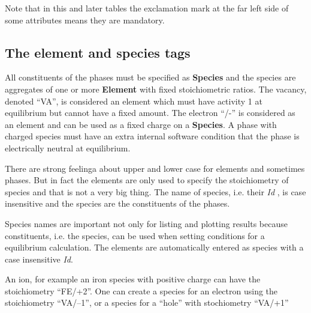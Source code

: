 \documentclass{article}
\begin{document}
Note that in this and later tables the exclamation mark at the far
left side of some attributes means they are mandatory.

\subsection{The element and species tags}\label{sec:elements}

All constituents of the phases must be specified as {\bf Species} and
the species are aggregates of one or more {\bf Element} with fixed
stoichiometric ratios.  The vacancy, denoted ``VA'', is considered an
element which must have activity 1 at equilibrium but cannot have a
fixed amount.  The electron ``/-'' is considered as an element and can
be used as a fixed charge on a {\bf Species}.  A phase with charged
species must have an extra internal software condition that the phase
is electrically neutral at equilibrium.

There are strong feelinga about upper and lower case for elements and
sometimes phases.  But in fact the elements are only used to specify
the stoichiometry of species and that is not a very big thing.  The name
of species, i.e. their {\em Id} , is case insensitive and the species
are the constituents of the phases.

Species names are important not only for listing and plotting results
because constituents, i.e. the species, can be used when setting
conditions for a equilibrium calculation.  The elements are
automatically entered as species with a case insensitive {\em Id}.

An ion, for example an iron species with positive charge can have the
stoichiometry ``FE/+2''.  One can create a species for an electron
using the stoichiometry ``VA/--1'', or a species for a ``hole'' with
stochiometry ``VA/+1''
\end{document}
